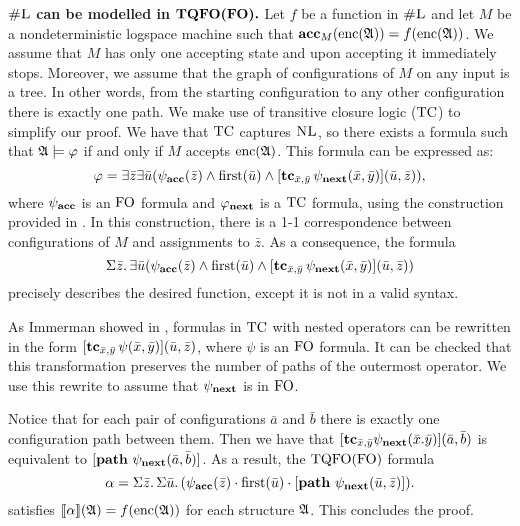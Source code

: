 \vspace{1em}
$\boldsymbol{\text{\sc \#L}}$ {\bf can be modelled in }$\boldsymbol{{\rm TQFO}({\rm FO}).}$ Let $f$ be a function in $\text{\sc \#L}$ and let $M$ be a nondeterministic logspace machine such that $\textbf{acc}_{M}({\rm enc}(\mathfrak{A})) = f({\rm enc}(\mathfrak{A}))$. We assume that $M$ has only one accepting state and upon accepting it immediately stops. Moreover, we assume that the graph of configurations of $M$ on any input is a tree. In other words, from the starting configuration to any other configuration there is exactly one path. We make use of transitive closure logic (${\rm TC}$) to simplify our proof. We have that ${\rm TC}$ captures $\text{\sc NL}$\cite{I83}, so there exists a formula such that $\mathfrak{A}\models\varphi$ if and only if $M$ accepts ${\rm enc}(\mathfrak{A})$. This formula can be expressed as:
$$
\varphi = \exists\bar{z}\exists\bar{u}(\psi_{\bf acc}(\bar{z})\wedge\operatorname{first}(\bar{u})\wedge [{\bf tc}_{\bar{x},\bar{y}}\,\psi_{\bf next}(\bar{x},\bar{y})](\bar{u},\bar{z})),
$$
where $\psi_{\bf acc}$ is an ${\rm FO}$ formula and $\varphi_{\bf next}$ is a ${\rm TC}$ formula, using the construction provided in \cite{G07}. In this construction, there is a 1-1 correspondence between configurations of $M$ and assignments to $\bar{z}$. As a consequence, the formula
$$
\Sigma{\bar{z}}.\,\exists\bar{u}(\psi_{\bf acc}(\bar{z})\wedge\operatorname{first}(\bar{u})\wedge [{\bf tc}_{\bar{x},\bar{y}}\,\psi_{\bf next}(\bar{x},\bar{y})](\bar{u},\bar{z}))
$$
precisely describes the desired function, except it is not in a valid syntax.

As Immerman showed in \cite{I83}, formulas in ${\rm TC}$ with nested operators can be rewritten in the form $[{\bf tc}_{\bar{x},\bar{y}}\,\psi(\bar{x},\bar{y})](\bar{u},\bar{z})$, where $\psi$ is an ${\rm FO}$ formula. It can be checked that this transformation preserves the number of paths of the outermost operator. We use this rewrite to assume that $\psi_{\bf next}$ is in ${\rm FO}$.

Notice that for each pair of configurations $\bar{a}$ and $\bar{b}$ there is exactly one configuration path between them. Then we have that $[{\bf tc}_{\bar{x},\bar{y}}\psi_{\bf next}(\bar{x}.\bar{y})](\bar{a},\bar{b})$ is equivalent to $[{\bf path} \,\, \psi_{\bf next}(\bar{a},\bar{b})]$. As a result, the ${\rm TQFO}({\rm FO})$ formula
$$
\alpha = \Sigma{\bar{z}}.\,\Sigma{\bar{u}}.\,(\psi_{\bf acc}(\bar{z})\cdot\operatorname{first}(\bar{u})\cdot[{\bf path} \,\, \psi_{\bf next}(\bar{u},\bar{z})]).
$$
satisfies ${\llbracket{}{\alpha}\rrbracket}(\mathfrak{A}) = f({\rm enc}(\mathfrak{A}))$ for each structure $\mathfrak{A}$. This concludes the proof.


